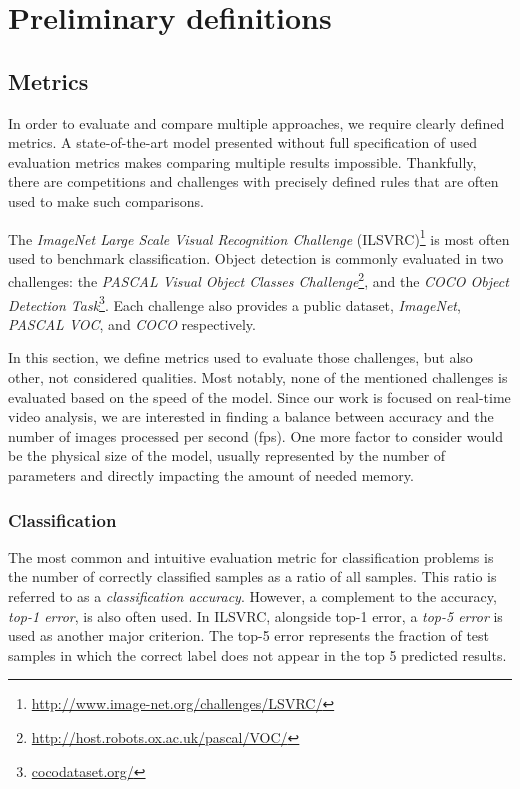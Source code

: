 \chapter{Preliminary definitions}

\section{Metrics}
In order to evaluate and compare multiple approaches, we require clearly defined metrics. A state-of-the-art model presented without full specification of used evaluation metrics makes comparing multiple results impossible. Thankfully, there are competitions and challenges with precisely defined rules that are often used to make such comparisons. 

The \textit{ImageNet Large Scale Visual Recognition Challenge }(ILSVRC)\footnote{\url{http://www.image-net.org/challenges/LSVRC/}} is most often used to benchmark classification. Object detection is commonly evaluated in two challenges: the \textit{PASCAL Visual Object Classes Challenge}\footnote{\url{http://host.robots.ox.ac.uk/pascal/VOC/}}, and the \textit{COCO Object Detection Task}\footnote{\url{cocodataset.org/}}. Each challenge also provides a public dataset, \textit{ImageNet}, \textit{PASCAL VOC}, and \textit{COCO} respectively.

In this section, we define metrics used to evaluate those challenges, but also other, not considered qualities. Most notably, none of the mentioned challenges is evaluated based on the speed of the model. Since our work is focused on real-time video analysis, we are interested in finding a balance between accuracy and the number of images processed per second (fps). One more factor to consider would be the physical size of the model, usually represented by the number of parameters and directly impacting the amount of needed memory.

\subsection{Classification}
The most common and intuitive evaluation metric for classification problems is the number of correctly classified samples as a ratio of all samples. This ratio is referred to as a \textit{classification accuracy}. However, a complement to the accuracy, \textit{top-1 error}, is also often used. In ILSVRC,  alongside top-1 error, a \textit{top-5 error} is used as another major criterion. The top-5 error represents the fraction of test samples in which the correct label does not appear in the top 5 predicted results.

